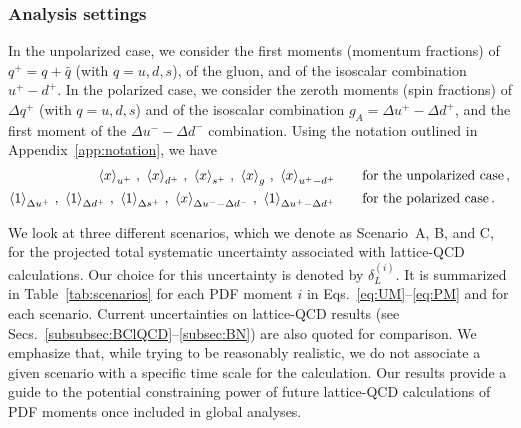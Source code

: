 \subsubsection{Analysis settings}
\label{sec:projections:settings}

In the unpolarized case,  we consider
the first moments (momentum fractions) of $q^+=q+\bar{q}$ (with $q=u,d,s$),
of the gluon, and of the isoscalar combination $u^+-d^+$.
%
In the polarized case, we consider the zeroth moments (spin fractions) 
of $\Delta q^+$ (with $q=u,d,s$) and of the isoscalar combination 
$g_A=\Delta u^+-\Delta d^+$, and the first moment of the 
$\Delta u^- - \Delta d^-$ combination.
%
Using the notation outlined in Appendix~\ref{app:notation}, we have
\begin{align}
\left\langle x\right\rangle_{u^+}\, , \
\left\langle x\right\rangle_{d^+}\, , \
\left\langle x\right\rangle_{s^+}\, , \
\left\langle x\right\rangle_{g}\, ,  \
\left\langle x\right\rangle_{u^+-d^+} & \qquad\text{for the unpolarized case} \, ,
\label{eq:UM}\\
\left\langle 1\right\rangle_{\Delta u^+}\, , \
\left\langle 1\right\rangle_{\Delta d^+}\, , \
\left\langle 1\right\rangle_{\Delta s^+}\, , \
\left\langle x\right\rangle_{\Delta u^--\Delta d^-}\, ,\
\left\langle 1\right\rangle_{\Delta u^+ - \Delta d^+} & \qquad\text{for the polarized case}\, .
\label{eq:PM}
\end{align}

We look at three different scenarios, which we denote
as Scenario~A, B, and C, for the projected total systematic
uncertainty associated with lattice-QCD calculations.
%
Our choice for this uncertainty is denoted by $\delta_L^{(i)}$.
%
It is summarized in Table~\ref{tab:scenarios} for each PDF moment $i$ in 
Eqs.~\eqref{eq:UM}--\eqref{eq:PM} and for each scenario.
%
Current uncertainties on lattice-QCD results 
(see Secs.~\ref{subsubsec:BClQCD}--\ref{subsec:BN})
are also quoted for comparison.
%
We emphasize that, while trying to be reasonably
realistic, we do not associate a given scenario
with a specific time scale for the calculation.
%
Our results provide a guide to the potential
constraining power of future lattice-QCD calculations
of PDF moments once included in global analyses. 
 
